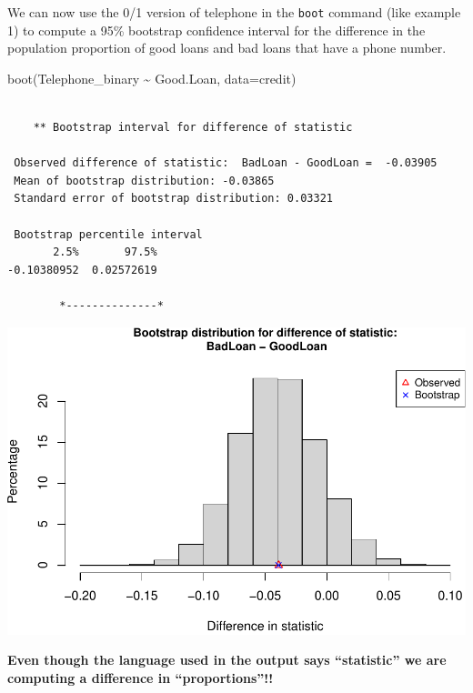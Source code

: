\documentclass[
]{book}
\newenvironment{Shaded}{\begin{snugshade}}{\end{snugshade}}
\newcommand{\AttributeTok}[1]{\textcolor[rgb]{0.77,0.63,0.00}{#1}}
\newcommand{\FunctionTok}[1]{\textcolor[rgb]{0.00,0.00,0.00}{#1}}
\newcommand{\NormalTok}[1]{#1}
\newcommand{\SpecialCharTok}[1]{\textcolor[rgb]{0.00,0.00,0.00}{#1}}
\begin{document}
We can now use the 0/1 version of telephone in the \texttt{boot} command (like example 1) to compute a 95\% bootstrap confidence interval for the difference in the population proportion of good loans and bad loans that have a phone number.

\begin{Shaded}
\begin{Highlighting}[]
\FunctionTok{boot}\NormalTok{(Telephone\_binary }\SpecialCharTok{\textasciitilde{}}\NormalTok{ Good.Loan, }\AttributeTok{data=}\NormalTok{credit)}
\end{Highlighting}
\end{Shaded}

\begin{verbatim}

    ** Bootstrap interval for difference of statistic

 Observed difference of statistic:  BadLoan - GoodLoan =  -0.03905 
 Mean of bootstrap distribution: -0.03865 
 Standard error of bootstrap distribution: 0.03321 

 Bootstrap percentile interval
       2.5%       97.5% 
-0.10380952  0.02572619 

        *--------------*
\end{verbatim}

\includegraphics[width=1\linewidth]{Class_Activity_8_files/figure-latex/unnamed-chunk-14-1}

\textbf{Even though the language used in the output says ``statistic'' we are computing a difference in ``proportions''!!}
\end{document}
